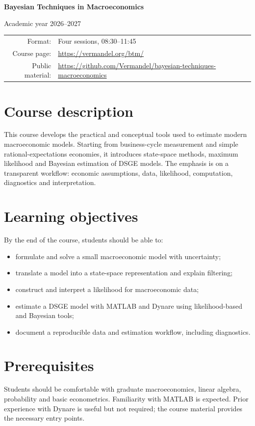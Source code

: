 \documentclass[11pt,a4paper]{article}
\newcommand{\course}{Bayesian Techniques in Macroeconomics}
\newcommand{\yearcourse}{2026--2027}
\newcommand{\coursepage}{\url{https://vermandel.org/btm/}}
\newcommand{\repository}{\url{https://github.com/Vermandel/bayesian-techniques-macroeconomics}}
\begin{document}
\begin{center}
{\LARGE\bfseries \course\par}
\vspace{0.35em}
{\large Academic year \yearcourse\par}
\vspace{0.8em}
{\small\begin{tabular}{rl}
Format: & Four sessions, 08:30--11:45 \\
Course page: & \coursepage \\
Public material: & \repository
\end{tabular}}
\end{center}

\section*{Course description}
This course develops the practical and conceptual tools used to estimate modern macroeconomic models. Starting from business-cycle measurement and simple rational-expectations economies, it introduces state-space methods, maximum likelihood and Bayesian estimation of DSGE models. The emphasis is on a transparent workflow: economic assumptions, data, likelihood, computation, diagnostics and interpretation.

\section*{Learning objectives}
By the end of the course, students should be able to:
\begin{itemize}
\item formulate and solve a small macroeconomic model with uncertainty;
\item translate a model into a state-space representation and explain filtering;
\item construct and interpret a likelihood for macroeconomic data;
\item estimate a DSGE model with MATLAB and Dynare using likelihood-based and Bayesian tools;
\item document a reproducible data and estimation workflow, including diagnostics.
\end{itemize}

\section*{Prerequisites}
Students should be comfortable with graduate macroeconomics, linear algebra, probability and basic econometrics. Familiarity with MATLAB is expected. Prior experience with Dynare is useful but not required; the course material provides the necessary entry points.
\end{document}

